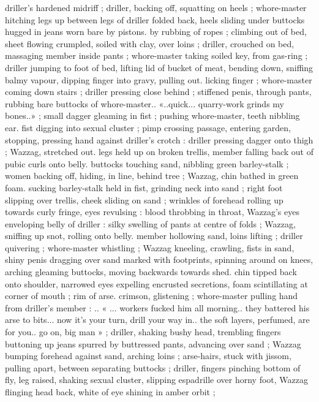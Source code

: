 driller's hardened midriff ; driller, backing off, squatting on heels ;
whore-master hitching legs up between legs of driller folded back,
heels sliding under buttocks hugged in jeans worn bare by pistons.
by rubbing of ropes ; climbing out of bed, sheet flowing crumpled,
soiled with clay, over loins ; driller, crouched on bed, massaging
member inside pants ; whore-master taking soiled key, from gas-ring
; driller jumping to foot of bed, lifting lid of bucket of meat, bending
down, sniffing balmy vapour, dipping finger into gravy, pulling out.
licking finger ; whore-master coming down stairs ; driller pressing
close behind ; stiffened penis, through pants, rubbing bare buttocks
of whore-master.. «..quick... quarry-work grinds my bones..» ; small
dagger gleaming in fist ; pushing whore-master, teeth nibbling ear.
fist digging into sexual cluster ; pimp crossing passage, entering
garden, stopping, pressing hand against driller’s crotch : driller
pressing dagger onto thigh ; Wazzag, stretched out. legs held up on
broken trellis, member falling back out of pubic curls onto belly.
buttocks touching sand, nibbling green barley-stalk ; women backing
off, hiding, in line, behind tree ; Wazzag, chin bathed in green foam.
sucking barley-stalk held in fist, grinding neck into sand ; right foot
slipping over trellis, cheek sliding on sand ; wrinkles of forehead
rolling up towards curly fringe, eyes revulsing : blood throbbing in
throat, Wazzag's eyes enveloping belly of driller : silky swelling of
pants at centre of folds ; Wazzag, sniffing up snot, rolling onto belly.
member hollowing sand, loins lifting ; driller quivering ; whore-master
whistling ; Wazzag kneeling, crawling, fists in sand, shiny penis
dragging over sand marked with footprints, spinning around on
knees, arching gleaming buttocks, moving backwards towards shed.
chin tipped back onto shoulder, narrowed eyes expelling encrusted
secretions, foam scintillating at corner of mouth ; rim of arse.
crimson, glistening ; whore-master pulling hand from driller's
member : .. « ... workers fucked him all morning.. they battered his
arse to bits... now it's your turn, drill your way in.. the soft layers,
perfumed, are for you.. go on, big man » ; driller, shaking bushy head,
trembling fingers buttoning up jeans spurred by buttressed pants,
advancing over sand ; Wazzag bumping forehead against sand,
arching loins ; arse-hairs, stuck with jissom, pulling apart, between
separating buttocks ; driller, fingers pinching bottom of fly, leg
raised, shaking sexual cluster, slipping espadrille over horny foot,
Wazzag flinging head back, white of eye shining in amber orbit ;
